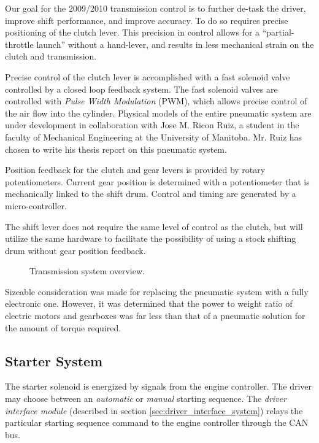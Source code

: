 Our goal for the 2009/2010 transmission control is to further de-task the driver, improve shift performance, and improve accuracy. To do so requires precise positioning of the clutch lever. This precision in control allows for a {}``partial-throttle launch'' without a hand-lever, and results in less mechanical strain on the clutch and transmission. 


Precise control of the clutch lever is accomplished with a fast solenoid valve controlled by a closed loop feedback system. The fast solenoid valves are controlled with \emph{Pulse Width Modulation} (PWM), which allows precise control of the air flow into the cylinder. Physical models of the entire pneumatic system are under development in collaboration with Jose M. Ricon Ruiz, a student in the faculty of Mechanical Engineering at the University of Manitoba. Mr. Ruiz has chosen to write his thesis report on this pneumatic system. 

Position feedback for the clutch and gear levers is provided by rotary potentiometers. Current gear position is determined with a potentiometer that is mechanically linked to the shift drum. Control and timing are generated by a micro-controller.

The shift lever does not require the same level of control as the clutch, but will utilize the same hardware to facilitate the possibility of using a stock shifting drum without gear position feedback.

\begin{figure}[H]
	\centering
		
	\caption{Transmission system overview.}
	\label{fig:transmission_system_overview}
\end{figure}

Sizeable consideration was made for replacing the pneumatic system with a fully electronic one. However, it was determined that the power to weight ratio of electric motors and gearboxes was far less than that of a pneumatic solution for the amount of torque required.

\subsection{Starter System}

The starter solenoid is energized by signals from the engine controller. The driver may choose between an \emph{automatic} or \emph{manual} starting sequence. The \emph{driver interface module} (described in section \ref{sec:driver_interface_system}) relays the particular starting sequence command to the engine controller through the CAN bus.

